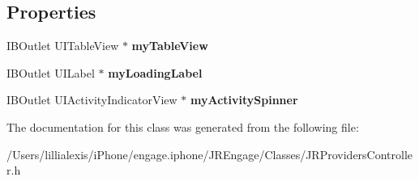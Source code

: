 \subsection*{Properties}
\begin{DoxyCompactItemize}
\item 
\hypertarget{interface_j_r_providers_controller_a99d8e64cdfe5174896f1eba136d680e9}{
IBOutlet UITableView $\ast$ {\bfseries myTableView}}
\label{interface_j_r_providers_controller_a99d8e64cdfe5174896f1eba136d680e9}

\item 
\hypertarget{interface_j_r_providers_controller_a47fba0ddce4b53c2ca1c2c612eee2976}{
IBOutlet UILabel $\ast$ {\bfseries myLoadingLabel}}
\label{interface_j_r_providers_controller_a47fba0ddce4b53c2ca1c2c612eee2976}

\item 
\hypertarget{interface_j_r_providers_controller_ae69ba233562717fc18c152c9762eef18}{
IBOutlet UIActivityIndicatorView $\ast$ {\bfseries myActivitySpinner}}
\label{interface_j_r_providers_controller_ae69ba233562717fc18c152c9762eef18}

\end{DoxyCompactItemize}


The documentation for this class was generated from the following file:\begin{DoxyCompactItemize}
\item 
/Users/lillialexis/iPhone/engage.iphone/JREngage/Classes/JRProvidersController.h\end{DoxyCompactItemize}
